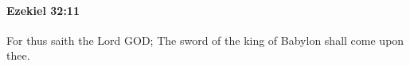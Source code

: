 
		\paragraph{Ezekiel 32:11} %
			\label{EZEKIEL-32-11}

			For thus saith the Lord GOD; The sword of the king of Babylon shall come upon thee.


